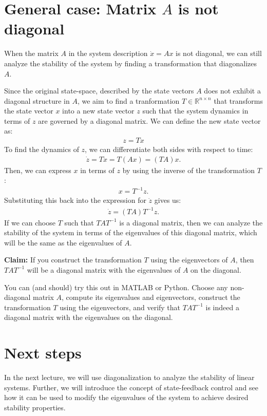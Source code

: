\documentclass{ee122_notes}
\begin{document}
\section{General case: Matrix $A$ is not diagonal}
When the matrix $A$ in the system description $\dot x = Ax$ is not diagonal, we can still analyze the stability of the system by finding a transformation that diagonalizes $A$. 

Since the original state-space, described by the state vectors $A$ does not exhibit a diagonal structure in $A$, we aim to find a tranformation $T \in \mathbb{R}^{n \times n}$ that transforms the state vector $x$ into a new state vector $z$ such that the system dynamics in terms of $z$ are governed by a diagonal matrix. We can define the new state vector as:
\begin{align*}
    z = Tx
\end{align*}
To find the dynamics of $z$, we can differentiate both sides with respect to time:
\begin{align*}
    \dot{z} = T\dot{x} = T(Ax) = (TA)x.
\end{align*}
Then, we can express $x$ in terms of $z$ by using the inverse of the transformation $T$:
\begin{align*}
    x = T^{-1}z.
\end{align*}
Substituting this back into the expression for $\dot{z}$ gives us:
\begin{align*}
    \dot{z} = (TA)T^{-1}z.
\end{align*}
If we can choose $T$ such that $TA T^{-1}$ is a diagonal matrix, then we can analyze the stability of the system in terms of the eigenvalues of this diagonal matrix, which will be the same as the eigenvalues of $A$.


\textbf{Claim:} If you construct the transformation $T$ using the eigenvectors of $A$, then $TA T^{-1}$ will be a diagonal matrix with the eigenvalues of $A$ on the diagonal.

You can (and should) try this out in MATLAB or Python. Choose any non-diagonal matrix $A$, compute its eigenvalues and eigenvectors, construct the transformation $T$ using the eigenvectors, and verify that $TA T^{-1}$ is indeed a diagonal matrix with the eigenvalues on the diagonal.

\section{Next steps}
In the next lecture, we will use diagonalization to analyze the stability of linear systems. Further, we will introduce the concept of state-feedback control and see how it can be used to modify the eigenvalues of the system to achieve desired stability properties.
\end{document}
